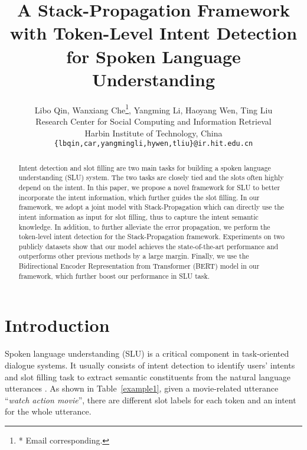 \documentclass[11pt,a4paper]{article}
\title{A Stack-Propagation Framework with Token-Level Intent Detection for Spoken Language Understanding }
\author{Libo Qin, Wanxiang Che\thanks{* Email corresponding.}, Yangming Li, Haoyang Wen, Ting Liu \\
	Research Center for Social Computing and Information Retrieval \\
	Harbin Institute of Technology, China \\
	{\tt \{lbqin,car,yangmingli,hywen,tliu\}@ir.hit.edu.cn}	
}
\date{}
\begin{document}
\maketitle
\begin{abstract}
Intent detection and slot filling are two main tasks for building a spoken language understanding (SLU) system. 
The two tasks are closely tied and the slots often highly depend on the
intent. 
In this paper, we propose a novel framework for SLU to better incorporate the intent information, which further guides the slot filling.
In our framework, we adopt a joint model with Stack-Propagation which can directly use the intent information as input for slot filling, thus to capture the intent semantic knowledge.
In addition, to further alleviate the error propagation, we perform the token-level intent detection for the Stack-Propagation framework.
Experiments on two publicly
datasets show that our model achieves the state-of-the-art 
performance and outperforms other previous methods by a large 
margin. 
Finally, we use the Bidirectional Encoder 
Representation from Transformer (BERT) model in our framework, which further boost our performance in SLU task.
\end{abstract}




\section{Introduction}
Spoken language understanding (SLU) is a critical component in task-oriented dialogue systems. It usually consists of intent detection
to identify users' intents and slot filling task to extract semantic constituents from the natural language utterances \cite{tur2011spoken}. 
As shown in Table~\ref{example1}, given a
movie-related utterance ``\textit{watch action movie}'', there are different slot labels for each token and an intent for the whole utterance.
\end{document}
